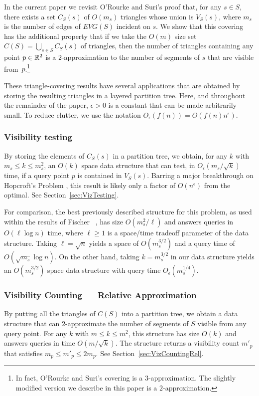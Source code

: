 \documentclass{patmorin}
\newcommand{\EVG}{\mathit{EVG}}
\newcommand{\Oe}{O_\epsilon}
\begin{document}
In the current paper we revisit O'Rourke and Suri's proof that, for any
$s\in S$, there exists a set $C_S(s)$ of $O(m_s)$ triangles whose union
is $V_S(s)$, where $m_s$ is the number of edges of $\EVG(S)$ incident
on $s$.  We show that this covering has the additional property that if
we take the $O(m)$ size set $C(S)=\bigcup_{s\in S}C_S(s)$ of triangles,
then the number of triangles containing any point $p\in\mathbb{R}^2$ is a
$2$-approximation to the number of segments of $s$ that are visible
from~$p$.\footnote{In fact, O'Rourke and Suri's covering is a
$3$-approximation.  The slightly modified version we describe in this
paper is a $2$-approximation.}

These triangle-covering results have several applications that are
obtained by storing the resulting triangles in a layered partition tree.
Here, and throughout the remainder of the paper, $\epsilon > 0$ is a
constant that can be made arbitrarily small. To reduce clutter, we use the
notation $\Oe(f(n))=O(f(n)n^{\epsilon})$.

\subsubsection{Visibility testing}

By storing the elements of $C_S(s)$ in a partition tree, we obtain, for
any $k$ with $m_s\le k\le m_s^2$, an $O(k)$ space data structure that can
test, in $\Oe(m_s/\sqrt{k})$ time, if a query point $p$ is contained in
$V_S(s)$.  Barring a major breakthrough on Hopcroft's Problem \cite{e96},
this result is likely only a factor of $O(n^\epsilon)$ from the optimal.
See Section~\ref{sec:VizTesting}.

For comparison, the best previously described structure
for this problem, as used within the results of Fischer \etal\
\cite{fhjmz08,fhjmz09}, has size $O(m_{s}^2/\ell)$ and answers queries
in $O(\ell\log n)$ time, where $\ell \ge 1$ is a space/time tradeoff
parameter of the data structure.  Taking $\ell=\sqrt{n}$ yields a space
of $O(m_s^{3/2})$ and a query time of $O(\sqrt{m_s}\log n)$.  On the other
hand, taking $k=m_s^{3/2}$ in our data structure yields an $O(m_s^{3/2})$
space data structure with query time $\Oe(m_s^{1/4})$.

\subsubsection{Visibility Counting --- Relative Approximation}

By putting all the triangles of $C(S)$ into a partition tree, we obtain
a data structure that can $2$-approximate the number of segments of $S$
visible from any query point.  For any $k$ with $m\le k\le m^2$, this
structure has size $O(k)$ and answers queries in time $O(m/\sqrt{k})$.  The
structure returns a visibility count $m'_p$ that satisfies $m_p \le m'_p\le
2m_p$. See Section~\ref{sec:VizCountingRel}.
\end{document}
